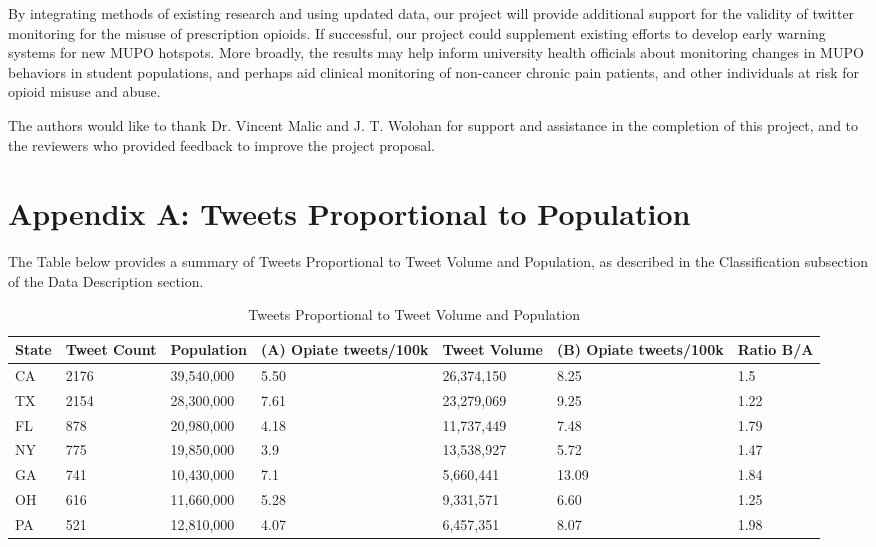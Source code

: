\documentclass[sigconf]{acmart}
\begin{document}
By integrating methods of existing research and using updated data, our project
will provide additional support for the validity of twitter monitoring for the
misuse of prescription opioids. If successful, our project could supplement 
existing efforts to develop early warning systems for new MUPO hotspots. More 
broadly, the results may help inform university health officials about
monitoring changes in MUPO behaviors in student populations, and perhaps aid 
clinical monitoring of non-cancer chronic pain patients, and other individuals 
at risk for opioid misuse and abuse. 




 
 

\begin{acks}
  The authors would like to thank Dr. Vincent Malic and J. T. Wolohan 
  for support and assistance in the completion of this project, and to the
  reviewers who provided feedback to improve the project proposal.
\end{acks}


 


\appendix

\section{Appendix A: Tweets Proportional to Population}
The Table below provides a summary of Tweets Proportional to Tweet 
Volume and Population, as described in the Classification subsection of 
the Data Description section.

\begin{table}[ht]
\centering
\caption{Tweets Proportional to Tweet Volume and Population}
\label{tab:1}
  \begin{tabular}{lllllll}
    \toprule
    State & Tweet Count & Population & (A) Opiate tweets/100k & Tweet Volume & 
    (B) Opiate tweets/100k & Ratio B/A \\
    \midrule     
    CA& 2176& 39,540,000& 5.50& 26,374,150& 8.25& 1.5 \\
    TX& 2154& 28,300,000& 7.61& 23,279,069& 9.25& 1.22 \\
    FL& 878& 20,980,000& 4.18& 11,737,449& 7.48& 1.79 \\
    NY& 775& 19,850,000& 3.9& 13,538,927& 5.72& 1.47 \\
    GA& 741& 10,430,000& 7.1& 5,660,441& 13.09& 1.84 \\
    OH& 616& 11,660,000& 5.28& 9,331,571& 6.60 & 1.25 \\
    PA& 521& 12,810,000& 4.07& 6,457,351& 8.07& 1.98 \\	
    \bottomrule
  \end{tabular}
\end{table}





%
\end{document}
